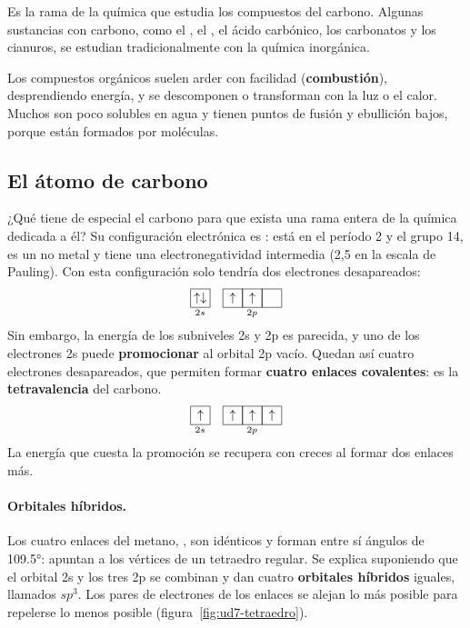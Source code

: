 \begin{definition}
    Es la rama de la química que estudia los compuestos del carbono. Algunas sustancias con carbono, como el , el ,
    el ácido carbónico, los carbonatos y los cianuros, se estudian tradicionalmente con la química inorgánica.
\end{definition}

Los compuestos orgánicos suelen arder con facilidad (\textbf{combustión}), desprendiendo energía, y se descomponen o transforman
con la luz o el calor. Muchos son poco solubles en agua y tienen puntos de fusión y ebullición bajos, porque están formados por
moléculas.

\subsection{El átomo de carbono}

¿Qué tiene de especial el carbono para que exista una rama entera de la química dedicada a él? Su configuración electrónica es
: está en el período 2 y el grupo 14, es un no metal y tiene una electronegatividad intermedia (2,5 en la
escala de Pauling). Con esta configuración solo tendría dos electrones desapareados:
\[ \underset{2s}{\orbcaja{\uparrow\downarrow}} \quad \underset{2p}{\orbcaja{\uparrow}\orbcaja{\uparrow}\orbcaja{}} \]
Sin embargo, la energía de los subniveles 2s y 2p es parecida, y uno de los electrones 2s puede \textbf{promocionar} al orbital 2p
vacío. Quedan así cuatro electrones desapareados, que permiten formar \textbf{cuatro enlaces covalentes}: es la
\textbf{tetravalencia} del carbono.
\[ \underset{2s}{\orbcaja{\uparrow}} \quad \underset{2p}{\orbcaja{\uparrow}\orbcaja{\uparrow}\orbcaja{\uparrow}} \]
La energía que cuesta la promoción se recupera con creces al formar dos enlaces más.

\paragraph{Orbitales híbridos.} Los cuatro enlaces del metano, , son idénticos y forman entre sí ángulos de
\ang{109.5}: apuntan a los vértices de un tetraedro regular. Se explica suponiendo que el orbital 2s y los tres 2p se combinan y dan
cuatro \textbf{orbitales híbridos} iguales, llamados \(sp^3\). Los pares de electrones de los enlaces se alejan lo más posible para
repelerse lo menos posible (figura~\ref{fig:ud7-tetraedro}).

